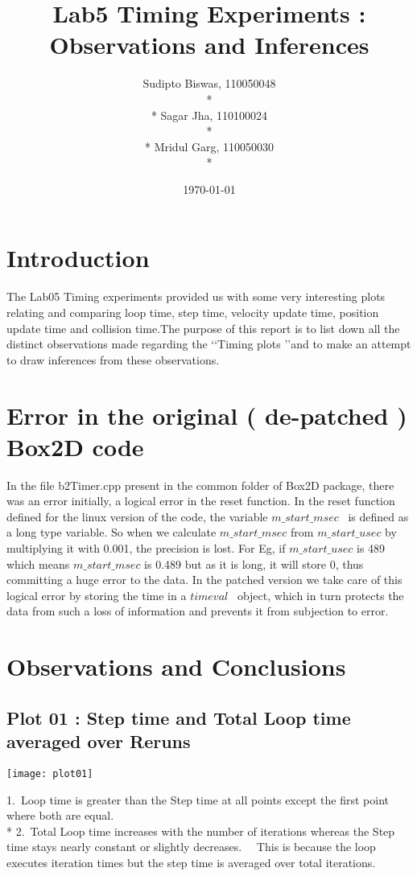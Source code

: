 \documentclass[10pt]{article}
\begin{document}
\title{Lab5 Timing Experiments : Observations and Inferences}
\author{ Sudipto Biswas, 110050048\\*
\\*
Sagar Jha, 110100024\\*
\\*
Mridul Garg, 110050030\\*
}
\date{\today}
\maketitle

\section{Introduction}
The Lab05 Timing experiments provided us with some very interesting plots relating and comparing loop time, step time, velocity update time, position update time and collision time.The purpose of this report is to list down all the distinct observations made regarding the \lq\lq Timing plots \rq\rq and to make an attempt to draw inferences from these observations.

\section{Error in the original ( de-patched ) Box2D code}
In the file b2Timer.cpp present in the common folder of Box2D package, there was an error initially, a logical error in the reset function. In the reset function defined for the linux version of the code, the variable $m\_start\_msec$ \ is defined as a long type variable. So when we calculate $m\_start\_msec$ from $m\_start\_usec$ by multiplying it with 0.001, the precision is lost. For Eg, if $m\_start\_usec$ is 489 which means $m\_start\_msec$ is 0.489 but as it is long, it will store 0, thus committing a huge error to the data. In the patched version we take care of this logical error by storing the time in a $timeval$ \ object, which in turn protects the data from such a loss of information and prevents it from subjection to error.

\section{Observations and Conclusions}
\subsection{Plot 01 : Step time and Total Loop time averaged over Reruns}
\begin{center}
\texttt{[image: plot01]}
\end{center}
1.\ Loop time is greater than the Step time at all points except the first point where both are equal.
\\* 2.\ Total Loop time increases with the number of iterations whereas the Step time stays nearly constant or slightly decreases. \ \ This is because the loop executes iteration times but the step time is averaged over total iterations.
\end{document}
